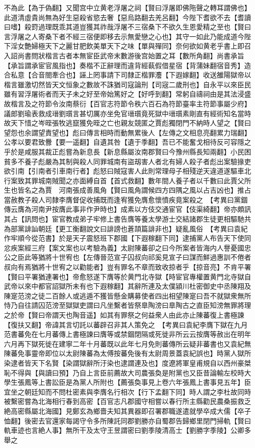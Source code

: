 不為此【為于偽翻】又聞宫中立黄老浮屠之祠【賢曰浮屠即佛陁聲之轉耳謂佛也】此道清虛貴尚無為好生惡殺省慾去奢【惡烏路翻去羌呂翻】今陛下耆欲不去【耆讀曰嗜】殺罸過理既乖其道豈獲其祚哉浮屠不三宿桑下不欲久生恩愛精之至也【賢曰言浮屠之人寄桑下者不經三宿便即移去示無愛戀之心也】其守一如此乃能成道今陛下淫女艶婦極天下之麗甘肥飲美單天下之味【單與殫同】奈何欲如黄老乎書上即召入詔尚書問狀楷言古者本無宦臣武帝末數游後宫始置之耳【數所角翻】尚書承旨【承旨謂承宦官風指也】奏楷不正辭理而違背經蓻假借星宿【背蒲妹翻宿音秀】造合私意【合音閤牽合也】誣上罔事請下司隸正楷罪灋【下遐嫁翻】收送雒陽獄帝以楷言雖激切然皆天文恒象之數故不誅猶司寇論刑【司宼二歲刑也】自永平以來臣民雖有習浮屠術者而天子未之好至帝始篤好之【好呼到翻】常躬自禱祠由是其法浸盛故楷言及之符節令汝南蔡衍【百官志符節令秩六百石為符節臺率主符節事屬少府】議郎劉瑜表救成瑨劉瓆言甚切厲亦坐免官瑨瓆竟死獄中瑨瓆素剛直有經術知名當時故天下惜之岑晊張牧逃竄獲免晊之亡也親友競匿之賈彪獨閉門不納時人望之【賢曰望怨也余謂望責望也】彪曰傳言相時而動無累後人【左傳之文相息亮翻累力瑞翻】公孝以要君致釁【要一遥翻】自遺其咎【遺于季翻】吾已不能奮戈相待反可容隱之乎於是咸服其裁正彪嘗為新息長【新息縣屬汝南郡賢曰今豫州縣長知兩翻】小民困貧多不養子彪嚴為其制與殺人同罪城南有盜刼害人者北有婦人殺子者彪出案驗掾吏欲引南【引南者引車南行者】彪怒曰賊寇害人此則常理母子相殘逆天違道遂驅車北行案致其罪城南賊聞之亦面縛自首【首式救翻】數年間人養子者以千數曰此賈父所生也皆名之為賈　河南張成善風角【賢曰風角謂候四方四隅之風以占吉凶也】推占當赦教子殺人司隸李膺督促收捕既而逢宥獲免膺愈懷憤疾竟案殺之　【考異曰黨錮傳云膺為河南尹按膺此事非作尹時也】成素以方伎交通宦官【伎渠綺翻】帝亦頗訊其占【訊問也】宦官教成弟子牢修上書告膺等養太學游士交結諸郡生徒更相驅馳共為部黨誹訕朝廷【更工衡翻說文曰誹謗也蒼頡篇誹非也】疑亂風俗　【考異曰袁紀作牢順今從范書】於是天子震怒班下郡國【下遐稼翻下同】逮捕黨人布告天下使同忿疾案經三府【案文案也以考驗為義】太尉陳蕃卻之曰今所案者皆海内人譽憂國忠公之臣此等猶將十世宥也【左傳晉范宣子囚叔向祁奚見宣子曰謀而鮮過惠訓不倦者叔向有焉猶將十世宥之以勸能者】豈有罪名不章而致收掠者乎【掠音亮】不肯平署【賢曰平署猶連署也】帝愈怒遂下膺等於黄門北寺獄【時宦官專權置黄門北寺獄自武帝以來中都官詔獄所未有也下遐稼翻】其辭所連及太僕潁川杜密御史中丞陳翔及陳寔范滂之徒二百餘人或逃遁不獲皆懸金購募使者四出相望陳寔曰吾不就獄衆無所恃乃自往請囚范滂至獄獄吏謂曰凡坐繫者皆祭臯陶滂曰臯陶古之直臣知滂無罪將理之於帝【賢曰帝謂天也陶音遥】如其有罪祭之何益衆人由此亦止陳蕃復上書極諫【復扶又翻】帝諱其言切託以蕃辟召非其人策免之　【考異曰袁紀李膺下獄在九月范書蕃免在七月蕃傳上書極諫曰膺等或禁錮閉隔或死徙非所云云按膺等赦出在明年六月再下獄死徙在建寧二年十月蕃既以此年七月免則蕃傳所云疑非蕃書也又袁紀無陳蕃免事靈帝即位以太尉陳蕃為太傅按蕃免後有太尉周景蓋袁紀誤也】時黨人獄所染逮者皆天下名賢【染謂獄辭所汙染也逮謂連及也】度遼將軍皇甫規自以西州豪桀恥不得與【與讀曰預】乃自上言臣前薦故大司農張奐是附黨也又臣昔論輸左校時大學生張鳳等上書訟臣是為黨人所附也【薦張奐事見上卷六年張鳳上書事見五年】臣宜坐之朝廷知而不問杜密素與李膺名行相次【行下孟翻下同】時人謂之李杜故同時被繫密嘗為北海相行春到高密【百官志凡郡國守相嘗以春行所主縣勸民農桑振救乏絶高密縣屬北海國】見鄭玄為鄉嗇夫知其異器即召署郡職遂遣就學卒成大儒【卒子恤翻】後密去官還家每謁守令多所陳託同郡劉勝亦自蜀郡告歸鄉里閉門掃軌【賢曰軌車迹也言絶人事】無所干及太守王昱謂密曰劉季陵清高士【劉勝字季陵】公卿多舉之